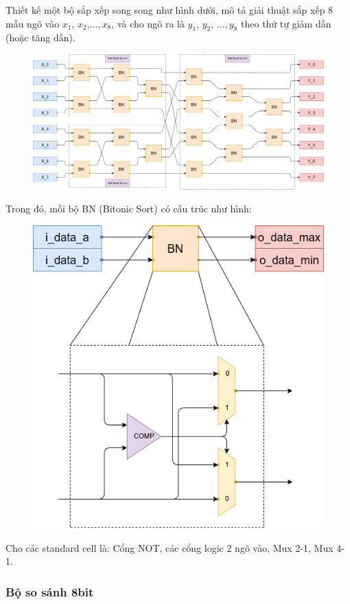 
Thiết kế một bộ sắp xếp song song như hình dưới, mô tả giải thuật sắp xếp 8 mẫu ngõ vào $x_{1}$, $x_{2}$,$\dots, x_{8}$, và cho ngõ ra là $y_{1}$, $y_{2}$, $\dots, y_{8}$ theo thứ tự giảm dần (hoặc tăng dần).

\begin{figure}[H]
	\centering
	\includegraphics[width=\linewidth]{./my-chapters/my-diagrams/Question6/debai.png}
\end{figure}

Trong đó, mỗi bộ BN (Bitonic Sort) có cấu trúc như hình:

\begin{figure}[H]
	\centering
	\includegraphics[width=.4\linewidth]{./my-chapters/my-diagrams/Question6/Swap_and_compare.png}
\end{figure}

Cho các standard cell là: Cổng NOT, các cổng logic 2 ngõ vào, Mux 2-1, Mux 4-1.


\subsubsection*{Bộ so sánh 8bit}

